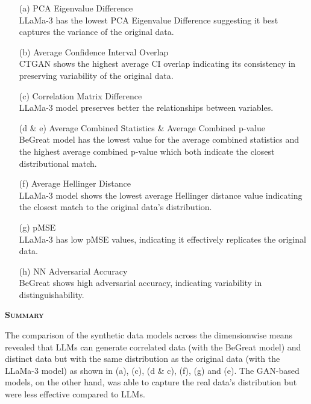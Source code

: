 \begin{enumerate}
    \item[(a)] PCA Eigenvalue Difference \\
    LLaMa-3 has the lowest PCA Eigenvalue Difference suggesting it best captures the variance of the original data. 

    \item[(b)] Average Confidence Interval Overlap \\
    CTGAN shows the highest average CI overlap indicating its consistency in preserving variability of the original data.

    \item[(c)] Correlation Matrix Difference \\
    LLaMa-3 model preserves better the relationships between variables.

    \item[(d \& e)] Average Combined Statistics \& Average Combined p-value \\
    BeGreat model has the lowest value for the average combined statistics and the highest average combined p-value which both indicate the closest distributional match.

    \item[(f)] Average Hellinger Distance \\
    LLaMa-3 model shows the lowest average Hellinger distance value indicating the closest match to the original data’s distribution.

    \item[(g)] pMSE \\
    LLaMa-3 has low pMSE values, indicating it effectively replicates the original data.

    \item[(h)] NN Adversarial Accuracy \\
    BeGreat shows high adversarial accuracy, indicating variability in distinguishability.
\end{enumerate}

\vspace{1cm}

\noindent \textsc{ \textbf{Summary}}

The comparison of the synthetic data models across the dimensionwise means revealed that LLMs can generate correlated data (with the BeGreat model) and distinct data but with the same distribution as the original data (with the LLaMa-3 model) as shown in (a), (c), (d \& c), (f), (g) and (e). The GAN-based models, on the other hand, was able to capture the real data's distribution but were less effective compared to LLMs. 

